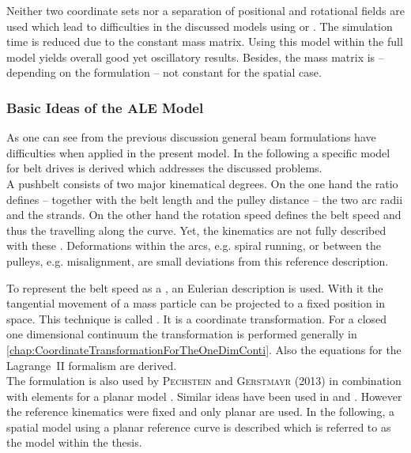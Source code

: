 Neither two coordinate sets nor a separation of positional and rotational fields are used which lead to difficulties in the discussed models using \RCM or \LRVM.
The simulation time is reduced due to the constant mass matrix.
Using this model within the full \CVT model yields overall good yet oscillatory results.
Besides, the mass matrix is -- depending on the formulation -- not constant for the spatial case.

\subsubsection{Basic Ideas of the ALE Model}

As one can see from the previous discussion general beam formulations have difficulties when applied in the present \CVT model.
In the following a specific model for belt drives is derived which addresses the discussed problems.\\
A pushbelt \CVT consists of two major kinematical degrees.
On the one hand the ratio defines -- together with the belt length and the pulley distance -- the two arc radii and the strands.
On the other hand the rotation speed defines the belt speed and thus the travelling along the curve.
Yet, the kinematics are not fully described with these \DOFs.
Deformations within the arcs, e.g. spiral running, or between the pulleys, e.g. misalignment, are small deviations from this reference description.\par

To represent the belt speed as a \DOF, an Eulerian description is used.
With it the tangential movement of a mass particle can be projected to a fixed position in space.
This technique is called \ALE.
It is a coordinate transformation.
For a closed one dimensional continuum the transformation is performed generally in \cref{chap:CoordinateTransformationForTheOneDimConti}.
Also the equations for the Lagrange~II formalism are derived.\\
The \ALE formulation is also used by \textsc{Pechstein} and \textsc{Gerstmayr} (2013) in combination with \ANCF elements for a planar model \cite{pechstein_lagrangeeulerian_2013}.
Similar ideas have been used in \cite{funk_simulation_2004} and \cite{bullinger_dynamik_2005}.
However the reference kinematics were fixed and only planar \DOFs are used.
In the following, a spatial model using a planar reference curve is described which is referred to as the \ALE model within the thesis.\par

